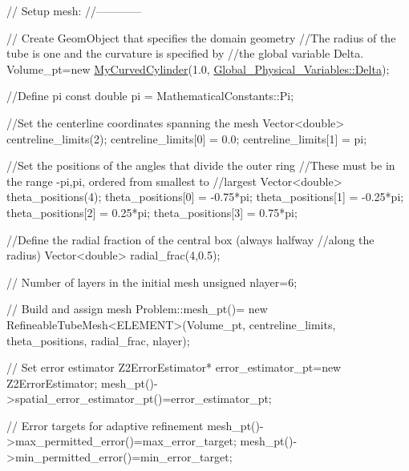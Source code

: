 \begin{DoxyCodeInclude}
 \textcolor{comment}{// Setup mesh:}
 \textcolor{comment}{//------------}

 \textcolor{comment}{// Create GeomObject that specifies the domain geometry}
 \textcolor{comment}{//The radius of the tube is one and the curvature is specified by}
 \textcolor{comment}{//the global variable Delta.}
 Volume\_pt=\textcolor{keyword}{new} \hyperlink{classMyCurvedCylinder}{MyCurvedCylinder}(1.0,
      \hyperlink{namespaceGlobal__Physical__Variables_add290b9e4a9c0e4c18a13faa7e29d857}{Global\_Physical\_Variables::Delta});
 
 \textcolor{comment}{//Define pi }
 \textcolor{keyword}{const} \textcolor{keywordtype}{double} pi = MathematicalConstants::Pi;
 
 \textcolor{comment}{//Set the centerline coordinates spanning the mesh}
 Vector<double> centreline\_limits(2);
 centreline\_limits[0] = 0.0;
 centreline\_limits[1] = pi;

 \textcolor{comment}{//Set the positions of the angles that divide the outer ring}
 \textcolor{comment}{//These must be in the range -pi,pi, ordered from smallest to}
 \textcolor{comment}{//largest}
 Vector<double> theta\_positions(4);
 theta\_positions[0] = -0.75*pi;
 theta\_positions[1] = -0.25*pi;
 theta\_positions[2] = 0.25*pi;
 theta\_positions[3] = 0.75*pi;

 \textcolor{comment}{//Define the radial fraction of the central box (always halfway}
 \textcolor{comment}{//along the radius)}
 Vector<double> radial\_frac(4,0.5);
 
 \textcolor{comment}{// Number of layers in the initial mesh}
 \textcolor{keywordtype}{unsigned} nlayer=6;

 \textcolor{comment}{// Build and assign mesh}
 Problem::mesh\_pt()= \textcolor{keyword}{new} RefineableTubeMesh<ELEMENT>(Volume\_pt,
                                                     centreline\_limits,
                                                     theta\_positions,
                                                     radial\_frac,
                                                     nlayer);
 
 \textcolor{comment}{// Set error estimator }
 Z2ErrorEstimator* error\_estimator\_pt=\textcolor{keyword}{new} Z2ErrorEstimator;
 mesh\_pt()->spatial\_error\_estimator\_pt()=error\_estimator\_pt;
 
 \textcolor{comment}{// Error targets for adaptive refinement}
 mesh\_pt()->max\_permitted\_error()=max\_error\_target; 
 mesh\_pt()->min\_permitted\_error()=min\_error\_target; 
 

\end{DoxyCodeInclude}
